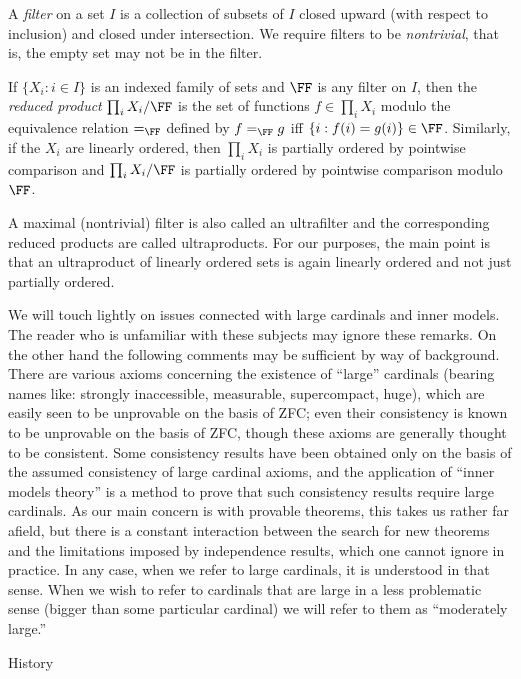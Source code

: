A {\it filter\/} on a set $I$ is a collection of subsets 
of $I$ closed
upward (with respect to inclusion) and closed under 
intersection.
We require filters to be {\it nontrivial\/}, that is, the 
empty set may
not be in the filter.
 
If $\{X_i:i\in I\}$ is an indexed family of sets and $\FF$ 
is any
filter on $I$, then the {\it reduced product\/} $\prod_i 
X_i/\FF$ is the
set of functions $f\in \prod_i X_i$ modulo the equivalence 
relation
$=_\FF$ defined by $f=_\FF g$ iff $\{i:f(i)=g(i)\}\in \FF$.
Similarly, if the $X_i$ are linearly ordered, then 
$\prod_i X_i$ is
partially ordered by pointwise comparison and $\prod_i 
X_i/\FF$ is
partially ordered by pointwise comparison modulo $\FF$.
 
A maximal (nontrivial) filter is also called an 
ultrafilter and the
 corresponding
reduced products are called ultraproducts.  For our 
purposes, the main
point is that an ultraproduct of linearly ordered sets is 
again
linearly ordered and not just partially ordered.
 
We will touch lightly on issues connected with large 
cardinals and
inner models.  The reader who is unfamiliar with these 
subjects may
ignore these remarks.  On the other hand the following 
comments may be
sufficient by way of background. There are various axioms 
concerning
the existence of ``large'' cardinals (bearing names like: 
strongly
inaccessible, measurable, supercompact, huge), which are 
easily seen to
be unprovable on the basis of ZFC; even their consistency 
is known to
be unprovable on the basis of ZFC, though these axioms are 
generally
thought to be consistent.  Some consistency results have 
been obtained
only on the basis of the assumed consistency of large 
cardinal axioms,
and the  application of ``inner models theory'' is a 
method to prove that such
consistency results require large cardinals.  As our main 
concern is
with provable theorems, this takes us rather far afield, 
but there is
a constant interaction between the search for new theorems 
and the
limitations imposed by independence results, which one 
cannot ignore
in practice.  In any case, when we refer to large 
cardinals, it is
understood in that sense.  When we wish to refer to 
cardinals
that are large in a less problematic sense (bigger than some
particular cardinal) we will refer to them as ``moderately 
large.''
 
{} History\endheading
 
